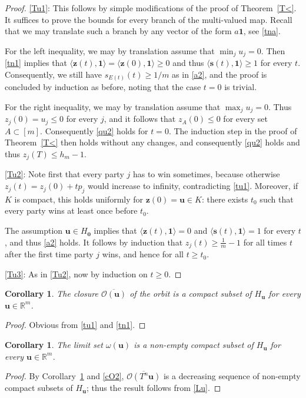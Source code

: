 \documentclass[11pt,reqno,tbtags,a4paper]{amsart}
\numberwithin{equation}{section}
\renewcommand\le{\leq}
\renewcommand\ge{\geq}
\renewcommand\leq{\leqslant}
\renewcommand\geq{\geqslant}
\theoremstyle{plain}%
\newtheorem{corollary}[theorem]{Corollary}
\theoremstyle{definition}
\theoremstyle{remark}
\newcommand\pfitemx[1]{\par#1:}
\newcommand\pfitemref[1]{\pfitemx{\ref{#1}}}
\newcommand{\refT}[1]{Theorem~\ref{#1}}
\newcommand{\refC}[1]{Corollary~\ref{#1}}
\newcommand\innprod[1]{\langle#1\rangle}
\newcommand\bbR{\mathbb R}
\newcommand\cL{{\omega}}
\newcommand\cO{\mathcal O}
\newcommand\Ho{H_{\0}}
\newcommand\vs{\mathbf{s}}
\newcommand\vu{\mathbf{u}}
\newcommand\vz{\mathbf{z}}
\newcommand\0{{\boldsymbol 0}}
\newcommand\1{{\boldsymbol 1}}
\begin{document}
\begin{proof}
\pfitemref{Tu1}
  This follows by simple modifications of the proof of \refT{T<}.
It suffices to prove the bounds for every branch of the multi-valued map.
Recall that we may translate such a branch by any vector of the form $a\1$, see
\eqref{tna}.

For the left inequality, we may by translation assume that $\min_j u_j=0$.
Then \eqref{tn1} implies that $\innprod{\vz(t),\1}=\innprod{\vz(0),\1}\ge0$
and thus $\innprod{\vs(t),\1}\ge1$ for every $t$. Consequently, we still have
$s_{E(t)}(t)\ge 1/m$ as in \eqref{a2}, and the proof is concluded by
induction as before, noting that the case $t=0$ is trivial.

For the right inequality, we may by translation assume that $\max_ju_j=0$.
Thus $z_j(0)=u_j\le0$ for every $j$, and it follows that $z_A(0)\le0$ for
every set $A\subset[m]$. Consequently \eqref{qu2} holds for $t=0$.
The induction step in the proof of \refT{T<} then holds without any changes,
and consequently \eqref{qu2} holds and thus $z_j(T)\le h_m-1$.

\pfitemref{Tu2}
Note first that every party $j$ has to win sometimes, because otherwise
$z_j(t)=z_j(0)+tp_j$ would increase to infinity, contradicting \eqref{tu1}.
Moreover, if $K$ is compact, this holds uniformly for $\vz(0)=\vu\in K$:
there exists $t_0$ such that every party wins at least 
once before $t_0$.

The assumption $\vu\in\Ho$ implies that $\innprod{\vz(t),\1}=0$
and $\innprod{\vs(t),\1}=1$ for every $t$, and thus \eqref{a2} holds.
It follows by induction that $z_j(t)\ge \frac{1}{m}-1$ for all times $t$
after the first time party $j$ wins, and hence for all $t\ge t_0$.

\pfitemref{Tu3}
As in \ref{Tu2}, now by induction on $t\ge0$.
\end{proof}

\begin{corollary}\label{Cu}
The closure $\overline{\cO(\vu)}$ of the orbit is a compact subset of $H_\vu$
for every $\vu\in\bbR^m$.
\end{corollary}
\begin{proof}
  Obvious from \eqref{tu1} and \eqref{tn1}.
\end{proof}


\begin{corollary}\label{CLu}
The limit set $\cL(\vu)$  is a non-empty compact subset of $H_\vu$
for every $\vu\in\bbR^m$.
\end{corollary}
\begin{proof}
By \refC{Cu} and \eqref{cO2},
$\overline{\cO(T^n \vu)}$ is a decreasing sequence of non-empty
compact subsets of $H_\vu$;
thus the result follows from \eqref{Lu}.
\end{proof}
\end{document}
